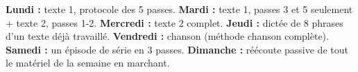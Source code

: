 \begin{mission}
\textbf{Lundi :} texte 1, protocole des 5 passes. \textbf{Mardi :} texte 1, passes 3 et 5
seulement + texte 2, passes 1-2. \textbf{Mercredi :} texte 2 complet.
\textbf{Jeudi :} dictée de 8 phrases d'un texte déjà travaillé. \textbf{Vendredi :} chanson
(méthode chanson complète). \textbf{Samedi :} un épisode de série en 3 passes.
\textbf{Dimanche :} réécoute passive de tout le matériel de la semaine en marchant.
\end{mission}
